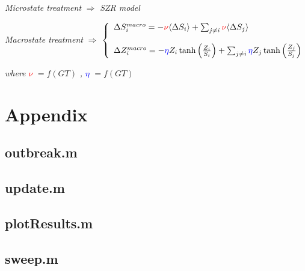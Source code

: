 \documentclass[11pt]{article} %
\begin{document}
\bigskip

\textit{Microstate treatment} $\Rightarrow$ \textit{SZR model} 

\bigskip

\textit{Macrostate treatment} $\Rightarrow$  $\left\{
	\begin{array}{l l}	
		\Delta S_{i}^{macro} = -\textcolor{red}{\nu} \langle \Delta S_{i} \rangle + \sum_{j\neq i}{\textcolor{red}{\nu} \langle \Delta S_{j} \rangle}  
    \\
    \\
    		\Delta Z_{i}^{macro} = -\textcolor{blue}{\eta} Z_{i}\tanh \left(\frac{Z_{i}}{S_{i}}\right) + \sum_{j\neq i}{\textcolor{blue}{\eta} Z_{j}\tanh \left(\frac{Z_{j}}{S_{j}}\right)} 

	\end{array} \right.$

\bigskip

\textit{where} \textcolor{red}{$\nu$} $= f(GT)$ \textit{,} \textcolor{blue}{$\eta$} $= f(GT)$  

\newpage

\nocite{bennett1995modelling, balcan2011phase, funk2010modelling, reluga2010game, reluga2009sis, munz2009zombies, drezner}

\newpage

\section{Appendix}

\subsection{outbreak.m}

\bigskip
\bigskip
\bigskip

\subsection{update.m}

\bigskip
\bigskip
\bigskip

\subsection{plotResults.m}

\bigskip
\bigskip
\bigskip

\subsection{sweep.m}

\end{document}
